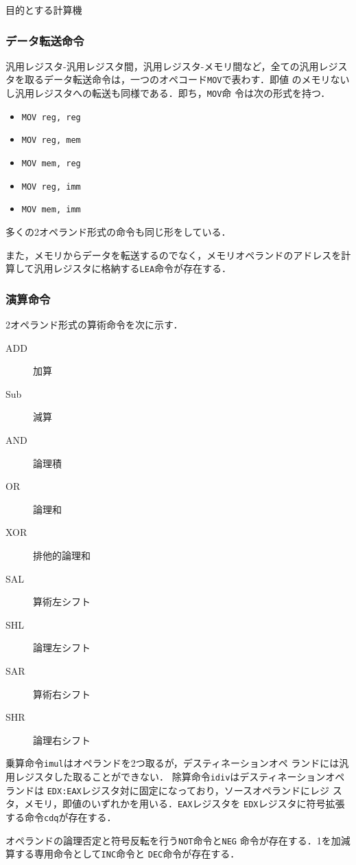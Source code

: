 \documentclass[a4paper,titlepage,report]{jsbook}
\begin{document}
\begin{resbonsiblesection}{目的とする計算機}{\kobori}
\subsubsection{データ転送命令}
汎用レジスタ-汎用レジスタ間，汎用レジスタ-メモリ間など，全ての汎用レジス
タを取るデータ転送命令は，一つのオペコード\lstinline|MOV|で表わす．即値
のメモリないし汎用レジスタへの転送も同様である．即ち，\lstinline|MOV|命
令は次の形式を持つ．
\begin{itemize}
 \item \lstinline|MOV reg, reg|
 \item \lstinline|MOV reg, mem|
 \item \lstinline|MOV mem, reg|
 \item \lstinline|MOV reg, imm|
 \item \lstinline|MOV mem, imm|
\end{itemize}
多くの2オペランド形式の命令も同じ形をしている．

また，メモリからデータを転送するのでなく，メモリオペランドのアドレスを計
算して汎用レジスタに格納する\lstinline|LEA|命令が存在する．

\subsubsection{演算命令}
2オペランド形式の算術命令を次に示す．
\begin{description}
 \item[ADD] 加算
 \item[Sub] 減算
 \item[AND] 論理積
 \item[OR] 論理和
 \item[XOR] 排他的論理和
 \item[SAL] 算術左シフト
 \item[SHL] 論理左シフト
 \item[SAR] 算術右シフト
 \item[SHR] 論理右シフト
\end{description}

乗算命令\lstinline|imul|はオペランドを2つ取るが，デスティネーションオペ
ランドには汎用レジスタした取ることができない．
除算命令\lstinline|idiv|はデスティネーションオペランドは
\lstinline|EDX:EAX|レジスタ対に固定になっており，ソースオペランドにレジ
スタ，メモリ，即値のいずれかを用いる．\lstinline|EAX|レジスタを
\lstinline|EDX|レジスタに符号拡張する命令\lstinline|cdq|が存在する．

オペランドの論理否定と符号反転を行う\lstinline|NOT|命令と\lstinline|NEG|
命令が存在する．1を加減算する専用命令として\lstinline|INC|命令と
\lstinline|DEC|命令が存在する．


\end{resbonsiblesection}
\end{document}
